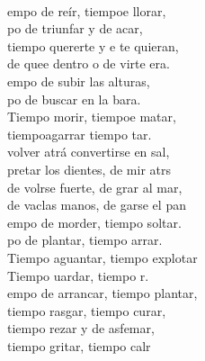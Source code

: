 \begin{cancion}%
	     \\
	empo de reír, tiempoe llorar,\\
	po de triunfar y de acar,\\
	tiempo  quererte y e te quieran,\\
	de quee dentro o de virte era.\\
\jump
	empo de subir las alturas,\\
	po de buscar en la bara.\\
	Tiempo  morir, tiempoe matar,\\
	tiempoagarrar tiempo  tar.\\
\jump
	 volver atrá convertirse en sal,\\
	pretar los dientes, de mir atrs\\
	de volrse fuerte, de grar al mar,\\
	de vaclas manos, de garse el pan\\
\jump
	empo de morder, tiempo  soltar.\\
	po de plantar, tiempo  arrar.\\
	Tiempo  aguantar, tiempo  explotar\\
	Tiempo uardar, tiempo  r.\\
\jump
	empo de arrancar, tiempo  plantar,\\
	tiempo  rasgar, tiempo curar,\\
	tiempo  rezar y de asfemar,\\
	tiempo  gritar, tiempo  calr\\\jump\\

\end{cancion}
